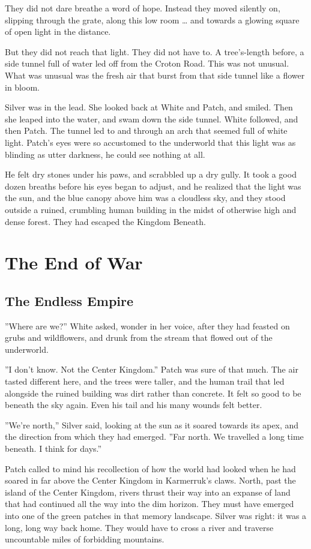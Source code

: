 \documentclass[12pt]{book}
\begin{document}
They did not dare breathe a word of hope. Instead they moved silently on, slipping through the grate, along this low room \ldots{}
and towards a glowing square of open light in the distance.

But they did not reach that light. They did not have to. A tree's-length before, a side tunnel full of water led off from the Croton Road. This was not unusual. What was unusual was the fresh air that burst from that side tunnel like a flower in bloom.

Silver was in the lead. She looked back at White and Patch, and smiled. Then she leaped into the water, and swam down the side tunnel. White followed, and then Patch. The tunnel led to and through an arch that seemed full of white light. Patch's eyes were so accustomed to the underworld that this light was as blinding as utter darkness, he could see nothing at all.

He felt dry stones under his paws, and scrabbled up a dry gully. It took a good dozen breaths before his eyes began to adjust, and he realized that the light was the sun, and the blue canopy above him was a cloudless sky, and they stood outside a ruined, crumbling human building in the midst of otherwise high and dense forest. They had escaped the Kingdom Beneath.


\chapter{The End of War}

\section{The Endless Empire}

''Where are we?'' White asked, wonder in her voice, after they had feasted on grubs and wildflowers, and drunk from the stream that flowed out of the underworld.

''I don't know. Not the Center Kingdom.'' Patch was sure of that much. The air tasted different here, and the trees were taller, and the human trail that led alongside the ruined building was dirt rather than concrete. It felt so good to be beneath the sky again. Even his tail and his many wounds felt better.

''We're north,'' Silver said, looking at the sun as it soared towards its apex, and the direction from which they had emerged. ''Far north. We travelled a long time beneath. I think for days.''

Patch called to mind his recollection of how the world had looked when he had soared in far above the Center Kingdom in Karmerruk's claws. North, past the island of the Center Kingdom, rivers thrust their way into an expanse of land that had continued all the way into the dim horizon. They must have emerged into one of the green patches in that memory landscape. Silver was right: it was a long, long way back home. They would have to cross a river and traverse uncountable miles of forbidding mountains.
\end{document}
